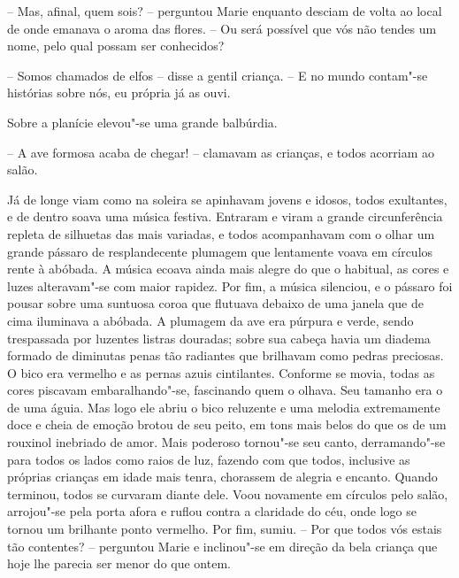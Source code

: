 -- Mas, afinal, quem sois? -- perguntou Marie enquanto desciam de volta 
ao local de onde emanava o aroma das flores. -- Ou será possível que vós não
tendes um nome, pelo qual possam ser conhecidos? 

-- Somos chamados de elfos -- disse a gentil criança. -- E no mundo contam"-se 
histórias sobre nós, eu própria já as ouvi.

Sobre a planície elevou"-se uma grande balbúrdia.

-- A ave formosa acaba de chegar! -- clamavam as crianças, e todos
acorriam ao salão.

Já de longe viam como na soleira se apinhavam jovens e idosos, todos
exultantes, e de dentro soava uma música festiva. Entraram e viram a
grande circunferência repleta de silhuetas das mais variadas, e todos
acompanhavam com o olhar um grande pássaro de resplandecente plumagem
que lentamente voava em círculos rente à abóbada. A música ecoava
ainda mais alegre do que o habitual, as cores e luzes alteravam"-se
com maior rapidez. Por fim, a música silenciou, e o pássaro foi pousar
sobre uma suntuosa coroa que flutuava debaixo de uma janela que de cima
iluminava a abóbada. A plumagem da ave era púrpura e verde, sendo
trespassada por luzentes listras douradas; sobre sua cabeça havia um
diadema formado de diminutas penas tão radiantes que brilhavam como
pedras preciosas. O bico era vermelho e as pernas azuis cintilantes.
Conforme se movia, todas as cores piscavam embaralhando"-se, fascinando
quem o olhava. Seu tamanho era o de uma águia. Mas logo ele abriu o
bico reluzente e uma melodia extremamente doce e cheia de emoção brotou
de seu peito, em tons mais belos do que os de um rouxinol inebriado de
amor. Mais poderoso tornou"-se seu canto, derramando"-se para todos os
lados como raios de luz, fazendo com que todos, inclusive as próprias
crianças em idade mais tenra, chorassem de alegria e encanto. Quando
terminou, todos se curvaram diante dele. Voou novamente em círculos
pelo salão, arrojou"-se pela porta afora e ruflou contra a claridade do
céu, onde logo se tornou um brilhante ponto vermelho. Por fim, sumiu.
\pagebreak
-- Por que todos vós estais tão contentes? -- perguntou Marie e
inclinou"-se em direção da bela criança que hoje lhe parecia ser menor
do que ontem.

